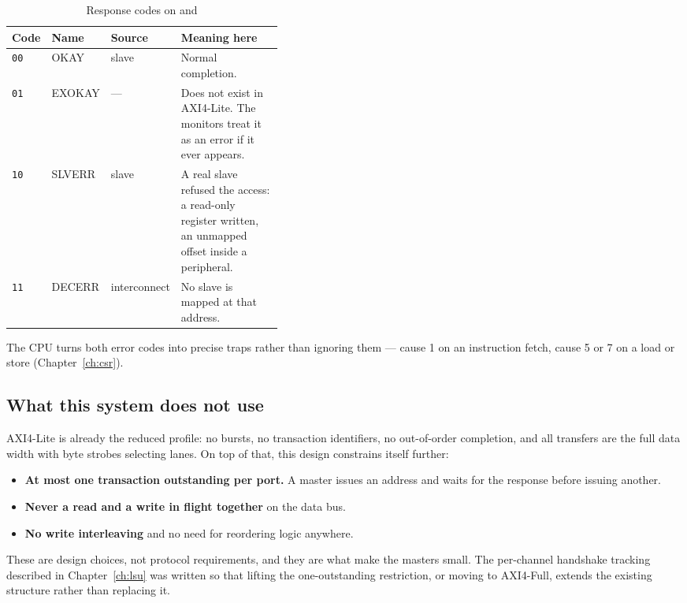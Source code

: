 \begin{table}[H]
\centering
\caption{Response codes on  and }
\label{tab:axiresp}
\begin{tabular}{@{}lllL{0.40\linewidth}@{}}
\toprule
\textbf{Code} & \textbf{Name} & \textbf{Source} & \textbf{Meaning here} \\
\midrule
\texttt{00} & OKAY   & slave        & Normal completion. \\
\texttt{01} & EXOKAY & ---          & Does not exist in AXI4-Lite. The monitors treat it as an error if it ever appears. \\
\texttt{10} & SLVERR & slave        & A real slave refused the access: a read-only register written, an unmapped offset inside a peripheral. \\
\texttt{11} & DECERR & interconnect & No slave is mapped at that address. \\
\bottomrule
\end{tabular}
\end{table}

The CPU turns both error codes into precise traps rather than ignoring them ---
cause 1 on an instruction fetch, cause 5 or 7 on a load or store
(Chapter~\ref{ch:csr}).

\subsection{What this system does not use}

AXI4-Lite is already the reduced profile: no bursts, no transaction identifiers,
no out-of-order completion, and all transfers are the full data width with byte
strobes selecting lanes. On top of that, this design constrains itself further:

\begin{itemize}[nosep]
  \item \textbf{At most one transaction outstanding per port.} A master issues an
        address and waits for the response before issuing another.
  \item \textbf{Never a read and a write in flight together} on the data bus.
  \item \textbf{No write interleaving} and no need for reordering logic anywhere.
\end{itemize}

These are design choices, not protocol requirements, and they are what make the
masters small. The per-channel handshake tracking described in
Chapter~\ref{ch:lsu} was written so that lifting the one-outstanding restriction,
or moving to AXI4-Full, extends the existing structure rather than replacing it.

